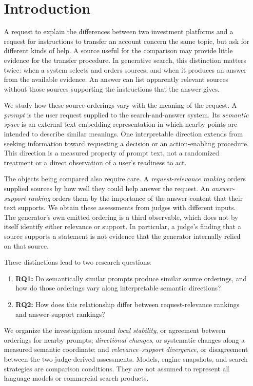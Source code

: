 \section{Introduction}
A request to explain the differences between two investment platforms and a request for instructions to transfer an account concern the same topic, but ask for different kinds of help. A source useful for the comparison may provide little evidence for the transfer procedure. In generative search, this distinction matters twice: when a system selects and orders sources, and when it produces an answer from the available evidence. An answer can list apparently relevant sources without those sources supporting the instructions that the answer gives.

We study how these source orderings vary with the meaning of the request. A \emph{prompt} is the user request supplied to the search-and-answer system. Its \emph{semantic space} is an external text-embedding representation in which nearby points are intended to describe similar meanings. One interpretable direction extends from seeking information toward requesting a decision or an action-enabling procedure. This direction is a measured property of prompt text, not a randomized treatment or a direct observation of a user's readiness to act.

The objects being compared also require care. A \emph{request-relevance ranking} orders supplied sources by how well they could help answer the request. An \emph{answer-support ranking} orders them by the importance of the answer content that their text supports. We obtain these assessments from judges with different inputs. The generator's own emitted ordering is a third observable, which does not by itself identify either relevance or support. In particular, a judge's finding that a source supports a statement is not evidence that the generator internally relied on that source.

These distinctions lead to two research questions:
\begin{enumerate}
\item \textbf{RQ1:} Do semantically similar prompts produce similar source orderings, and how do those orderings vary along interpretable semantic directions?
\item \textbf{RQ2:} How does this relationship differ between request-relevance rankings and answer-support rankings?
\end{enumerate}
We organize the investigation around \emph{local stability}, or agreement between orderings for nearby prompts; \emph{directional changes}, or systematic changes along a measured semantic coordinate; and \emph{relevance--support divergence}, or disagreement between the two judge-derived assessments. Models, engine snapshots, and search strategies are comparison conditions. They are not assumed to represent all language models or commercial search products.

